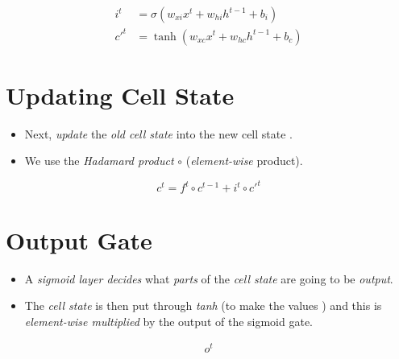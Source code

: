 \documentclass[
	number={10},
	title={Recurrent Neural Networks}
]{cs584notes}
\begin{document}
\begin{equation}
	\begin{aligned}
		i^{t} &= \sigma \left( w_{xi}x^{t} + w_{hi}h^{t-1} + b_{i} \right)\\
		c'^{t} &= \tanh\left( w_{xc}x^{t} + w_{hc}h^{t-1} + b_{c} \right)
	\end{aligned}
	\label{eq:ignore-gate}
\end{equation}

\section{Updating Cell State}\label{sec:updating-cell-state}
\begin{itemize}
	\item Next, \emph{update} the \emph{old cell state}  into the new cell state .
	\item We use the \emph{Hadamard product} $\circ$ (\emph{element-wise} product).
\end{itemize}

\begin{equation}
	c^{t} = f^{t} \circ c^{t-1} + i^{t} \circ c'^{t}
	\label{eq:updating-cell-state}
\end{equation}

\section{Output Gate}\label{sec:output-gate}
\begin{itemize}
	\item A \emph{sigmoid layer decides} what \emph{parts} of the \emph{cell state} are going to be \emph{output}.
	\item The \emph{cell state} is then put through \emph{tanh} (to make the values \data{$\in [-1, 1]$}) and this is \emph{element-wise multiplied} by the output of the sigmoid gate.
\end{itemize}
\begin{equation}
	\begin{aligned}
		o^{t}
	\end{aligned}
	\label{eq:output-gate}
\end{equation}
\end{document}
